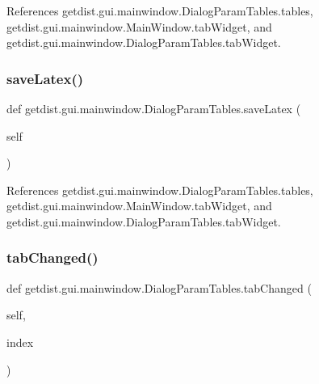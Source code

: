 References getdist.\+gui.\+mainwindow.\+Dialog\+Param\+Tables.\+tables, getdist.\+gui.\+mainwindow.\+Main\+Window.\+tab\+Widget, and getdist.\+gui.\+mainwindow.\+Dialog\+Param\+Tables.\+tab\+Widget.

\mbox{\label{classgetdist_1_1gui_1_1mainwindow_1_1DialogParamTables_a5b15ea8df2a02b958f00ee7f497516ad}} 
\subsubsection{\texorpdfstring{save\+Latex()}{saveLatex()}}
{\footnotesize\ttfamily def getdist.\+gui.\+mainwindow.\+Dialog\+Param\+Tables.\+save\+Latex (\begin{DoxyParamCaption}\item[{}]{self }\end{DoxyParamCaption})}



References getdist.\+gui.\+mainwindow.\+Dialog\+Param\+Tables.\+tables, getdist.\+gui.\+mainwindow.\+Main\+Window.\+tab\+Widget, and getdist.\+gui.\+mainwindow.\+Dialog\+Param\+Tables.\+tab\+Widget.

\mbox{\label{classgetdist_1_1gui_1_1mainwindow_1_1DialogParamTables_af75bab99f7b1c92141dd199a261f722d}} 
\subsubsection{\texorpdfstring{tab\+Changed()}{tabChanged()}}
{\footnotesize\ttfamily def getdist.\+gui.\+mainwindow.\+Dialog\+Param\+Tables.\+tab\+Changed (\begin{DoxyParamCaption}\item[{}]{self,  }\item[{}]{index }\end{DoxyParamCaption})}



